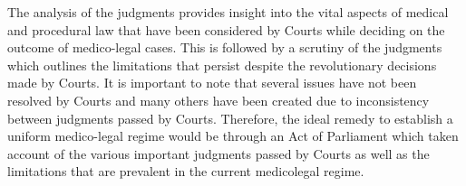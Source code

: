 \begin{multicols}{2}
\noi
The analysis of the judgments provides insight into the vital aspects of medical and procedural
law that have been considered by Courts while deciding on the outcome of medico-legal cases.
This is followed by a scrutiny of the judgments which outlines the limitations that persist despite
the revolutionary decisions made by Courts. It is important to note that several issues have not
been resolved by Courts and many others have been created due to inconsistency between
judgments passed by Courts. Therefore, the ideal remedy to establish a uniform medico-legal
regime would be through an Act of Parliament which taken account of the various important
judgments passed by Courts as well as the limitations that are prevalent in the current medicolegal regime.
\end{multicols}
\label{end2018-art7}

